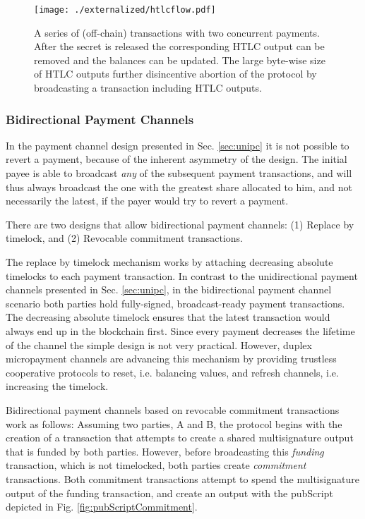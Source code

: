 \begin{figure}
\centering
\texttt{[image: ./externalized/htlcflow.pdf]}
\caption{A series of (off-chain) transactions with two concurrent payments. After the secret is released the corresponding HTLC output can be removed and the balances can be updated. The large byte-wise size of HTLC outputs further disincentive abortion of the protocol by broadcasting a transaction including HTLC outputs.}
\label{fig:htlcflow}
\end{figure}

\subsubsection{Bidirectional Payment Channels}

In the payment channel design presented in Sec. \ref{sec:unipc} it is not possible to revert a payment, because of the inherent asymmetry of the design. The initial payee is able to broadcast \emph{any} of the subsequent payment transactions, and will thus always broadcast the one with the greatest share allocated to him, and not necessarily the latest, if the payer would try to revert a payment. 

There are two designs that allow bidirectional payment channels: (1) Replace by timelock, and (2) Revocable commitment transactions.

The replace by timelock mechanism works by attaching decreasing absolute timelocks to each payment transaction. In contrast to the unidirectional payment channels presented in Sec. \ref{sec:unipc}, in the bidirectional payment channel scenario both parties hold fully-signed, broadcast-ready payment transactions. The decreasing absolute timelock ensures that the latest transaction would always end up in the blockchain first. Since every payment decreases the lifetime of the channel the simple design is not very practical. However, duplex micropayment channels are advancing this mechanism by providing trustless cooperative protocols to reset, i.e. balancing values, and refresh channels, i.e. increasing the timelock. 

Bidirectional payment channels based on revocable commitment transactions work as follows:
Assuming two parties, A and B, the protocol begins with the creation of a transaction that attempts to create a shared multisignature output that is funded by both parties. However, before broadcasting this \emph{funding} transaction, which is not timelocked, both parties create \emph{commitment} transactions. Both commitment transactions attempt to spend the multisignature output of the funding transaction, and create an output with the pubScript depicted in Fig. \ref{fig:pubScriptCommitment}.

